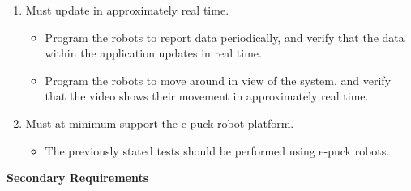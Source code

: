 \begin{enumerate}[label=C\arabic*.]
 \item Must update in approximately real time.
 \begin{itemize}
  \item Program the robots to report data periodically, and verify that the data within the application updates in real time.
  \item Program the robots to move around in view of the system, and verify that the video shows their movement in approximately real time.
 \end{itemize}
 
 \item Must at minimum support the e-puck robot platform.
 \begin{itemize}
  \item The previously stated tests should be performed using e-puck robots.
 \end{itemize}
\end{enumerate}

\textbf{Secondary Requirements}

